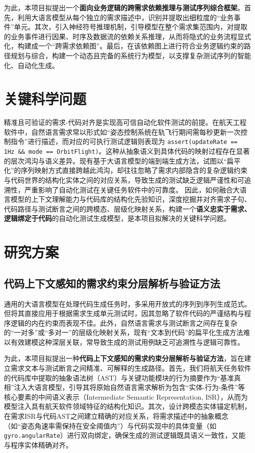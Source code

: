 \documentclass[12pt]{article}
\begin{document}
为此，本项目拟提出一个\textbf{面向业务逻辑的跨需求依赖推理与测试序列综合框架}。首先，利用大语言模型从每个独立的需求描述中，识别并提取出细粒度的“业务事件”单元。其次，引入神经符号推理机制，引导模型在整个需求集范围内，对提取的业务事件进行因果、时序及数据流的依赖关系推理，从而将隐式的业务流程显式化，构建成一个“跨需求依赖图”。最后，在该依赖图上进行符合业务逻辑约束的路径规划与综合，构建一个动态且完备的系统行为模型，以支撑复杂测试序列的智能化、自动化生成。

\section{关键科学问题}


精准且可验证的需求-代码对齐是实现高可信自动化软件测试的前提。在航天工程软件中，自然语言需求常以形式如“姿态控制系统在轨飞行期间需每秒更新一次控制指令”进行描述，而对应的可执行测试逻辑则表现为 \texttt{assert(updateRate == 1Hz \&\& mode == OrbitFlight)}。这种从抽象语义到具体代码的映射过程存在显著的层次鸿沟与语义差异。现有基于大语言模型的端到端生成方法，试图以“扁平化”的序列映射方式直接跨越此鸿沟，却往往忽略了需求内部隐含的复杂逻辑约束与代码世界的结构化实体之间的对应关系，导致生成的测试缺乏逻辑严谨性和可追溯性，严重影响了自动化测试在关键任务软件中的可靠度。
因此，如何融合大语言模型的上下文理解能力与代码库的结构化先验知识，深度挖掘并对齐需求子句、代码路径与测试断言之间的跨模态、层级化映射关系，构建一个\textbf{语义忠实于需求、逻辑绑定于代码}的自动化测试生成模型，是本项目拟解决的关键科学问题。



\section{研究方案}

\subsection{代码上下文感知的需求约束分层解析与验证方法}

通用的大语言模型在处理代码生成任务时，多采用开放式的序列到序列生成范式。但将其直接应用于根据需求生成单元测试时，因其忽略了软件代码的严谨结构与程序逻辑的内在约束而表现不佳。此外，自然语言需求与测试断言之间存在复杂的“一对多”或“多对一”的层级化映射关系，现有“文本到代码”的扁平化生成方法难以有效建模这种深层关联，常导致生成的测试用例缺乏可追溯性与逻辑可靠性。

为此，本项目拟提出一种\textbf{代码上下文感知的需求约束分层解析与验证方法}，旨在建立需求文本与测试断言之间精准、可解释的生成路径。首先，我们将航天任务软件的代码库中提取的抽象语法树（AST）与关键功能模块的行为摘要作为“基准真相”注入大语言模型，引导其将原始自然语言需求解析为包含“实体-行为-条件”等核心要素的中间语义表示（Intermediate Semantic Representation, ISR），从而为模型注入具有航天软件领域特征的结构化知识。其次，设计跨模态实体锚定机制，在需求ISR与代码AST之间建立精确的对应关系，将需求描述中的抽象概念（如“姿态角速率需保持在安全阈值内”）与代码实现中的具体变量（如 \texttt{gyro.angularRate}）进行双向绑定，确保生成的测试逻辑既具语义一致性，又能与程序实体精确对齐。
\end{document}
